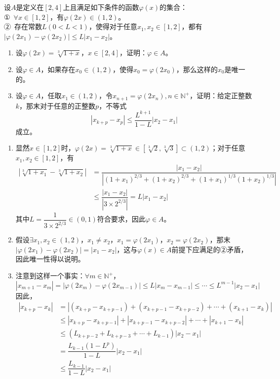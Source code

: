 \begin{que}
	设$A$是定义在$[2,4]$上且满足如下条件的函数$\varphi(x)$的集合：\\
	①\ $\forall x\in[1,2]$，有$\varphi(2x)\in(1,2)$。\\
	②\ 存在常数$L(0<L<1)$，使得对于任意$x_1,x_2\in[1,2]$，都有$|\varphi(2x_1)-\varphi(2x_2)|\leqslant L|x_1-x_2|$。
	\begin{enumerate}
		\item 设$\varphi(2x)=\sqrt[3]{1+x}$，$x\in[2,4]$，证明：$\varphi\in A$。
		\item 设$\varphi\in A$，如果存在$x_0\in(1,2)$，使得$x_0=\varphi(2x_0)$，那么这样的$x_0$是唯一的。
		\item 设$\varphi\in A$，任取$x_1\in(1,2)$，令$x_{n+1}=\varphi(2x_n),n\in\mathbb{N}^+$，证明：给定正整数$k$，那末对于任意的正整数$p$，不等式$$|x_{k+p}-x_{p}|\leqslant \dfrac{L^{k+1}}{1-L}|x_2-x_1|$$成立。
	\end{enumerate}
\end{que}
\sol \begin{enumerate}
	\item {}显然$x\in[1,2]$时，$\varphi(2x)=\sqrt[3]{1+x}\in[\sqrt[3]{2},\sqrt[3]{3}]\subset(1,2)$；对于任意$x_1,x_2\in[1,2]$，有
	$$\begin{aligned}
		\left|\sqrt[3]{1+x_1}-\sqrt[3]{1+x_2}\right|&=\dfrac{|x_1-x_2|}{|(1+x_1)^{2/3}+(1+x_2)^{2/3}+(1+x_1)^{1/3}(1+x_2)^{1/3}|}\\
		&\leqslant\dfrac{|x_1-x_2|}{|3\times 2^{2/3}|}=L|x_1-x_2|
	\end{aligned}$$
	其中$L=\dfrac{1}{3\times 2^{2/3}}\in(0,1)$符合要求，因此$\varphi \in A$。
	\item 假设$\exists x_1,x_2\in(1,2)$，$x_1\neq x_2$，$x_1=\varphi(2x_1)$，$x_2=\varphi(2x_2)$，那末
	$|\varphi(2x_1)-\varphi(2x_2)|=|x_1-x_2|$，这与$\varphi(x)\in A$前提下应满足的②矛盾，因此唯一性得以说明。
	\item 注意到这样一个事实：$\forall m\in\mathbb{N}^+$，
	$$|x_{m+1}-x_m|=|\varphi(2x_{m})-\varphi(2x_{m-1})|\leqslant L|x_m-x_{m-1}|\leqslant\cdots\leqslant L^{m-1}|x_2-x_1|$$ 因此，
	$$\begin{aligned}
		|x_{k+p}-x_k|&=|(x_{k+p}-x_{k+p-1})+(x_{k+p-1}-x_{k+p-2})+\cdots+(x_{k+1}-x_k)|\\
		&\leqslant |x_{k+p}-x_{k+p-1}|+|x_{k+p-1}-x_{k+p-2}|+\cdots+|x_{k+1}-x_k|\\
		&\leqslant (L_{k+p-2}+L_{k+p-3}+\cdots+L_{k-1})|x_2-x_1|\\
		&=\dfrac{L_{k-1}(1-L^{p})}{1-L}|x_2-x_1|\\&\leqslant \dfrac{L_{k-1}}{1-L}|x_2-x_1|
	\end{aligned}$$
\end{enumerate}\par\hfill{}\normal\par

